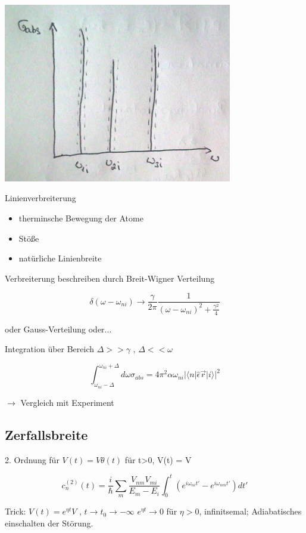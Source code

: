\includegraphics[width=0.75\textwidth]{kap03_12.png}

Linienverbreiterung
\begin{itemize}
\item therminsche Bewegung der Atome
\item Stöße
\item natürliche Linienbreite
\end{itemize}

Verbreiterung beschreiben durch Breit-Wigner Verteilung

\[ \delta(\omega-\omega_{ni}) \rightarrow \frac{\gamma}{2\pi}\frac{1}{(\omega-\omega_{ni})^2+\frac{\gamma^2}{4}}\]

oder Gauss-Verteilung oder...


Integration über Bereich \(\Delta > >\gamma\) , \(\Delta << \omega\)

\[\int_{\omega_{ni}-\Delta}^{\omega_{ni}+\Delta}d\omega\sigma_{abs} = 4\pi^2\alpha \omega_{ni}|\langle n|\hat\epsilon \vec r|i \rangle |^2\]

\(\rightarrow \) Vergleich mit Experiment


\subsection{Zerfallsbreite}

2. Ordnung für \(V(t)=V\theta(t)\) für t>0, V(t) = V

\[c^{(2)}_n(t) = \frac{i}{\hbar}\sum_m\frac{V_{nm}V_{mi}}{E_m-E_i}\int_0^t (e^{i\omega_{ni}t'}-e^{i\omega_{nm}t'})dt'\]

Trick: \(V(t) = e^{\eta t}V\) , \(t\rightarrow t_0\rightarrow -\infty\) \( e^{\eta t}\rightarrow 0\) für \(\eta>0\), infinitsemal; Adiabatisches einschalten der Störung.

